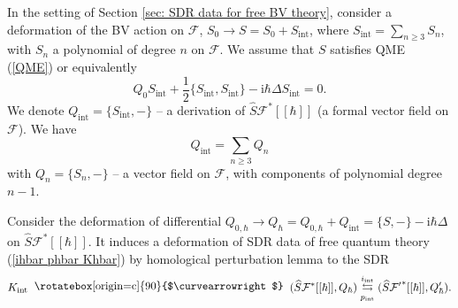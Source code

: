 \documentclass{amsart}
\theoremstyle{plain} %
\theoremstyle{definition}
\theoremstyle{remark}
\newcommand{\ra}{\rightarrow}
\newcommand{\wh}{\widehat}
\newcommand{\F}{\mathcal{F}}
\newcommand{\ii}{\mathrm{int}}
\newcommand{\iii}{\mathrm{i}}
\newcommand{\fun}{\widehat{S}\mathcal{F}^*[[\hbar]]}
\newcommand{\funprime}{\widehat{S}\mathcal{F'}^*[[\hbar]]}
\newcommand{\SDR}[5]{#5\;\;\raisebox{1.3pt}{\rotatebox[origin=c]{90}{$\curvearrowright$}}\;\; #1 \underset{#4}{\stackrel{#3}{\leftrightarrows}} #2}  %
\begin{document}
In the setting of Section \ref{sec: SDR data for free BV theory}, consider a deformation of the BV action on $\F$, $S_0\ra S=S_0+S_\ii$, where $S_\ii=\sum_{n\geq 3}S_n$, with $S_n$ a polynomial of degree $n$ on $\F$. We assume that $S$ satisfies QME (\ref{QME}) or equivalently 
\begin{equation}
Q_0 S_\ii+\frac12\{S_\ii,S_\ii\}-\iii\hbar\Delta S_\ii=0.
\end{equation}
We denote $Q_\ii=\{S_\ii,-\}$ -- a derivation of $\fun$ (a formal vector field on $\F$). We have 
\begin{equation}\label{Q_int = sum Q_n}
Q_\ii=\sum_{n\geq 3}Q_n
\end{equation} 
with $Q_n=\{S_n,-\}$
-- a vector field on $\F$, with components of polynomial degree $n-1$.


Consider the deformation of differential $Q_{0,\hbar}\ra Q_\hbar=Q_{0,\hbar}+Q_\ii=\{S,-\}-\iii\hbar\Delta$ on $\fun$. It induces a deformation of SDR data of free quantum theory (\ref{ihbar phbar Khbar}) by homological perturbation lemma to the SDR
\begin{equation}\label{SDR for interacting quantum theory}
    \SDR{(\fun,Q_\hbar)}{(\funprime,Q'_\hbar)}{i_{\ii}}{p_{\ii}}{K_{\ii}}.
\end{equation}
\end{document}
